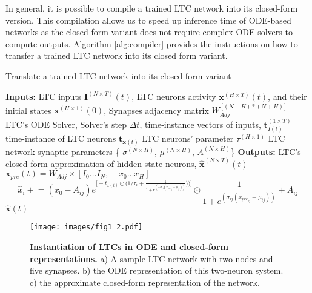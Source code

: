 \documentclass[12pt]{article}
\begin{document}
In general, it is possible to compile a trained LTC network into its closed-form version. This compilation allows us to speed up inference time of ODE-based networks as the closed-form variant does not require complex ODE solvers to compute outputs. Algorithm \ref{alg:compiler} provides the instructions on how to transfer a trained LTC network into its closed form variant.

\begin{algorithm}[t]
\caption{Translate a trained LTC network into its closed-form variant}
\label{alg:compiler}
\begin{algorithmic}
\STATE \textbf{Inputs:} LTC inputs $\textbf{I}^{(N \times T)}(t)$, LTC neurons activity $\textbf{x}^{(H \times T)}(t)$, and their initial states $\textbf{x}^{(H \times 1)}(0)$, Synapses adjacency matrix $W^{[(N+H) * (N+H)]}_{Adj}$ 
\STATE LTC's ODE Solver, Solver's step $\Delta t$, 
\STATE time-instance vectors of inputs, $\textbf{t}^{(1 \times T)}_{I(t)}$ 
\STATE time-instance of LTC neurons $\textbf{t}_{\textbf{x}(t)}$ 
    \STATE LTC neurons' parameter $\tau^{(H \times 1)}$
    \STATE LTC network synaptic parameters \{ $\sigma^{(N \times H)}$, $\mu^{(N \times H)}$, $A^{(N \times H)}$\}
    \STATE \textbf{Outputs:} LTC's closed-form approximation of hidden state neurons, $\hat{\textbf{x}}^{(N \times T)}(t)$
\STATE $\textbf{x}_{pre}(t) = W_{Adj} \times [I_0 \dots I_N,~~~~~ x_0 \dots x_H]$ 
        \STATE  \begin{equation}
        \hat{x}_{i} \mathrel{+}= (x_0 - A_{ij}) e^{\Big[-t_{x(t)} \odot \Big(1/\tau_i + \frac{1}{1+ e^{(-\sigma_{ij} (x_{pre_{ij}}-\mu_{ij}))}}\Big))\Big]} \odot \frac{1}{1+ e^{(\sigma_{ij} (x_{pre_{ij}}-\mu_{ij}))}} + A_{ij} \nonumber
            \end{equation}
    \ENDFOR
\ENDFOR
    \RETURN ${\hat{\textbf{x}}}(t)$
\end{algorithmic}
\end{algorithm}

\begin{figure}[t]
	\centering
	\texttt{[image: images/fig1\_2.pdf]}
	\caption{\textbf{Instantiation of LTCs in ODE and closed-form representations.} a) A sample LTC network with two nodes and five synapses. b) the ODE representation of this two-neuron system. c) the approximate closed-form representation of the network.}
	\label{fig:sample}
\end{figure}
\end{document}
